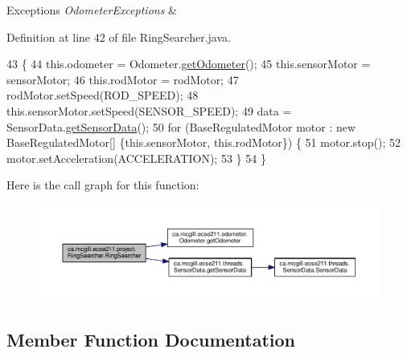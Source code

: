 \begin{DoxyExceptions}{Exceptions}
{\em Odometer\+Exceptions} & \\
\hline
\end{DoxyExceptions}


Definition at line 42 of file Ring\+Searcher.\+java.


\begin{DoxyCode}
43                                 \{
44     this.odometer = Odometer.\hyperlink{classca_1_1mcgill_1_1ecse211_1_1odometer_1_1_odometer_a99171f11e34dea918fa9dd069d721439}{getOdometer}();
45     this.sensorMotor = sensorMotor;
46     this.rodMotor = rodMotor;
47     rodMotor.setSpeed(ROD\_SPEED);
48     this.sensorMotor.setSpeed(SENSOR\_SPEED);
49     data = SensorData.\hyperlink{classca_1_1mcgill_1_1ecse211_1_1threads_1_1_sensor_data_a8260aba53b4474ca1275e4ce26157977}{getSensorData}();
50     \textcolor{keywordflow}{for} (BaseRegulatedMotor motor : \textcolor{keyword}{new} BaseRegulatedMotor[] \{this.sensorMotor, this.rodMotor\}) \{
51       motor.stop();
52       motor.setAcceleration(ACCELERATION);
53     \}
54   \}
\end{DoxyCode}
Here is the call graph for this function\+:\nopagebreak
\begin{figure}[H]
\begin{center}
\leavevmode
\includegraphics[width=350pt]{classca_1_1mcgill_1_1ecse211_1_1project_1_1_ring_searcher_a37eebb6cbdfd692e0979c3ca0fe2597b_cgraph}
\end{center}
\end{figure}


\subsection{Member Function Documentation}
\mbox{\label{classca_1_1mcgill_1_1ecse211_1_1project_1_1_ring_searcher_a997bf874ae5577c48719254677830fb7}} 
